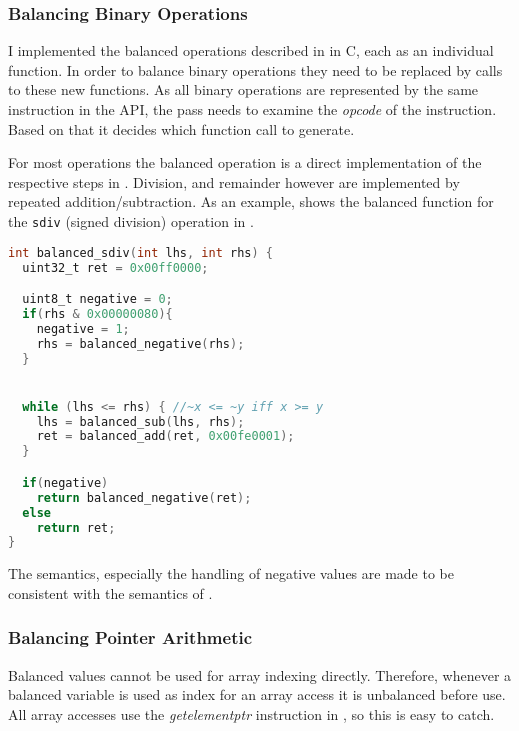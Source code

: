 
\subsubsection{Balancing Binary Operations}
I implemented the balanced operations described in  in C, each as an individual function.
In order to balance binary operations they need to be replaced by calls to these new functions.
As all binary operations are represented by the same instruction in the \llvm{} API, the pass needs to examine the \emph{opcode} of the instruction.
Based on that it decides which function call to generate.

For most operations the balanced operation is a direct implementation of the respective steps in .
Division, and remainder however are implemented by repeated addition/subtraction.
As an example,  shows the balanced function for the \texttt{sdiv} (signed division) operation in \ir{}.

\begin{lstlisting}[language=C, caption=Balanced sdiv, label=lst:sdiv]
int balanced_sdiv(int lhs, int rhs) {
  uint32_t ret = 0x00ff0000;

  uint8_t negative = 0;
  if(rhs & 0x00000080){
    negative = 1;
    rhs = balanced_negative(rhs);
  }


  while (lhs <= rhs) { //~x <= ~y iff x >= y
    lhs = balanced_sub(lhs, rhs);
    ret = balanced_add(ret, 0x00fe0001);
  }

  if(negative)
    return balanced_negative(ret);
  else
    return ret;
}
\end{lstlisting}

The semantics, especially the handling of negative values are made to be consistent with the semantics of \llvm{}.

\subsubsection{Balancing Pointer Arithmetic}
Balanced values cannot be used for array indexing directly.
Therefore, whenever a balanced variable is used as index for an array access it is unbalanced before use.
All array accesses use the \emph{getelementptr} instruction in \ir{}, so this is easy to catch.

